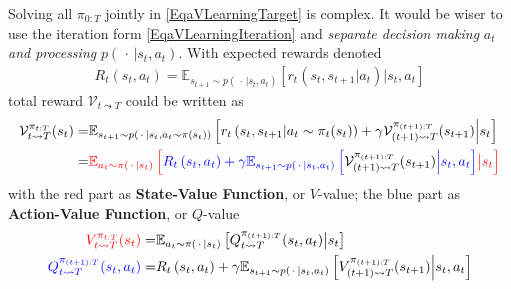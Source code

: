 Solving all $ \pi_{0:T} $ jointly in \autoref{EqaVLearningTarget} is complex. It would be wiser to use the iteration form \autoref{EqaVLearningIteration} and \textit{separate decision making} $ a_t $ \textit{and processing} $ p(\, \cdot \, |s_t,a_t) $. With expected rewards denoted
\begin{align}
    R_t(s_t,a_t)= \mathbb{E}_{s_{t+1}\sim p\left(\, \cdot \, |s_t,a_t\right)}\left[ r_t(s_t,s_{t+1}|a_t)\big| s_t,a_t \right]
\end{align}
total reward $ \mathcal{V}_{t\leadsto T} $ could be written as
\begin{align}
    \mathcal{V}_{t\leadsto T}^{\pi_{t:T}}(s_t)=&\mathbb{E}_{s_{t+1}\sim p\left(\, \cdot \, |s_t,a_t\sim\pi(s_t)\right)}\left[ r_t\left(s_t,s_{t+1}|a_t\sim \pi_t(s_t)\right)+\gamma \mathcal{V}_{(t+1)\leadsto T}^{\pi_{(t+1):T}} (s_{t+1})\Big|s_t\right] \\
    =&{\color{red}\mathbb{E}_{a_t\sim \pi(\, \cdot \, |s_t)}\left[{\color{blue}R_{t}\left(s_t,a_t\right)+  \gamma\mathbb{E}_{s_{t+1}\sim p\left(\, \cdot \, |s_t,a_t\right)}\left[{\color{black}  \mathcal{V}_{(t+1)\leadsto T}^{\pi_{(t+1):T}} (s_{t+1})} \Big| s_t,a_t \right]}  \big|s_t\right]}
\end{align}
with the {red} part as \textbf{State-Value Function}, or {\color{red}$ V $-value}; the {blue} part as \textbf{Action-Value Function}, or {\color{blue}$ Q $-value}
\begin{align}
    {\color{red}V_{t\leadsto T}^{\pi_{t:T}}(s_t)}=&\mathbb{E}_{a_t\sim \pi(\, \cdot \, |s_t)}\left[ Q_{t\leadsto T}^{\pi_{(t+1):T}}(s_t,a_t)  \big|s_t\right]\\
    {\color{blue}Q_{t\leadsto T}^{\pi_{(t+1):T}}(s_t,a_t)}=&R_t\left(s_t,a_t\right)+\gamma \mathbb{E}_{s_{t+1}\sim p\left(\, \cdot \, |s_t,a_t\right)}\left[V_{(t+1)\leadsto T}^{\pi_{(t+1):T}} (s_{t+1})\Big| s_t,a_t\right]
\end{align}


